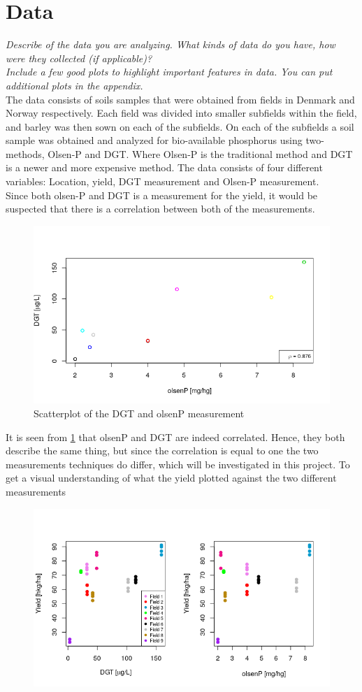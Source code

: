 \documentclass[11pt, fleqn, titlepage]{article}
\begin{document}
\section{Data}
\textit{Describe of the data you are analyzing. What kinds of data do you have, how were they collected (if applicable)? \\ Include a few good plots to highlight important features in data. You can put additional plots in the appendix.}\\
\noindent
The data consists of soils samples that were obtained from fields in Denmark and Norway respectively. Each field was divided into smaller subfields within the field, and barley was then sown on each of the subfields. On each of the subfields a soil sample was obtained and analyzed for bio-available phosphorus using two-methods, Olsen-P and DGT. Where Olsen-P is the traditional method and DGT is a newer and more expensive method. The data consists of four different variables: Location, yield, DGT measurement and Olsen-P measurement.  
\\ \noindent 
Since both olsen-P and DGT is a measurement for the yield, it would be suspected that there is a correlation between both of the measurements. 
\begin{figure}[H]
	\centering
	\includegraphics[width=0.7\linewidth]{billeder/dgtolsencor.png}
	\caption{Scatterplot of the DGT and olsenP measurement}
	\label{fig:dgtolsencor}
\end{figure}
\noindent It is seen from \ref{fig:dgtolsencor} that olsenP and DGT are indeed correlated. Hence, they both describe the same thing, but since the correlation is equal to one the two measurements techniques do differ, which will be investigated in this project. To get a visual understanding of what the yield plotted against the two different measurements 


\begin{figure}[H]
	\centering
	\includegraphics[width=0.7\linewidth]{billeder/measurementz}
	\caption{}
	\label{fig:measurementz}
\end{figure}
\end{document}
